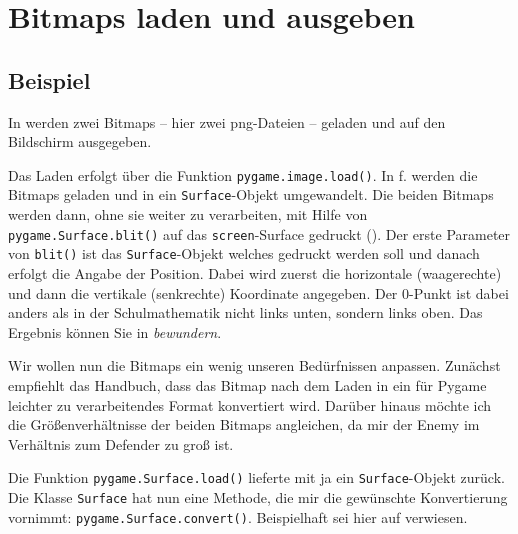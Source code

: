 \chapter{Bitmaps laden und ausgeben}

\section{Beispiel}


In  werden zwei Bitmaps -- hier zwei png-Dateien -- geladen und auf den Bildschirm ausgegeben. 

Das Laden erfolgt über die Funktion \texttt{pygame.image.load()}. In f. werden die Bitmaps geladen und in ein \texttt{Surface}-Objekt umgewandelt. Die beiden Bitmaps werden dann, ohne sie weiter zu verarbeiten, mit Hilfe von \texttt{pygame.Surface.blit()} auf das \texttt{screen}-Surface gedruckt (). Der erste Parameter von \texttt{blit()} ist das \texttt{Surface}-Objekt welches gedruckt werden soll und danach erfolgt die Angabe der Position. Dabei wird zuerst die horizontale (waagerechte) und dann die vertikale (senkrechte) Koordinate angegeben. Der 0-Punkt ist dabei anders als in der Schulmathematik nicht links unten, sondern links oben. Das Ergebnis können Sie in  \emph{bewundern}.


Wir wollen nun die Bitmaps ein wenig unseren Bedürfnissen anpassen. Zunächst empfiehlt das Handbuch, dass das Bitmap nach dem Laden in ein für Pygame leichter zu verarbeitendes Format konvertiert wird. Darüber hinaus möchte ich die Größenverhältnisse der beiden Bitmaps angleichen, da mir der Enemy im Verhältnis zum Defender zu groß ist. 


Die Funktion \texttt{pygame.Surface.load()} lieferte mit ja ein \texttt{Surface}-Objekt zurück. Die Klasse \texttt{Surface} hat nun eine Methode, die mir die gewünschte Konvertierung vornimmt: \texttt{pygame.Surface.convert()}. Beispielhaft sei hier auf  verwiesen. 

